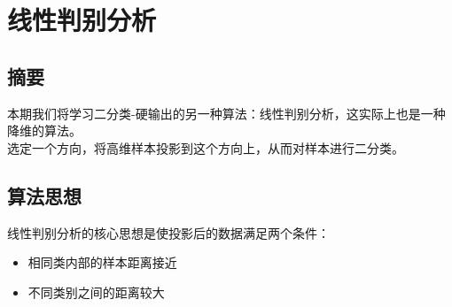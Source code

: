 \documentclass{report}
\begin{document}
\section{线性判别分析}
\subsection{摘要}
本期我们将学习二分类-硬输出的另一种算法：线性判别分析，这实际上也是一种降维的算法。\\
选定一个方向，将高维样本投影到这个方向上，从而对样本进行二分类。
\subsection{算法思想}
线性判别分析的核心思想是使投影后的数据满足两个条件：
\begin{itemize}
	\item 相同类内部的样本距离接近
	\item 不同类别之间的距离较大
\end{itemize}
\end{document}
